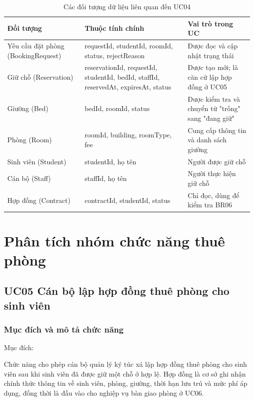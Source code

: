 \begin{table}[H]
\centering
\small
\caption{Các đối tượng dữ liệu liên quan đến UC04}
\label{tab:ch2-8}
\begin{tabularx}{\textwidth}{|>{\raggedright\arraybackslash}p{}|>{\raggedright\arraybackslash}X|>{\raggedright\arraybackslash}p{}|}
\hline
\textbf{Đối tượng} & \textbf{Thuộc tính chính} & \textbf{Vai trò trong UC} \\
\hline
Yêu cầu đặt phòng (BookingRequest) & requestId, studentId, roomId, status, rejectReason & Được đọc và cập nhật trạng thái \\
\hline
Giữ chỗ (Reservation) & reservationId, requestId, studentId, bedId, staffId, reservedAt, expiresAt, status & Được tạo mới; là căn cứ lập hợp đồng ở UC05 \\
\hline
Giường (Bed) & bedId, roomId, status & Được kiểm tra và chuyển từ "trống" sang "đang giữ" \\
\hline
Phòng (Room) & roomId, building, roomType, fee & Cung cấp thông tin và danh sách giường \\
\hline
Sinh viên (Student) & studentId, họ tên & Người được giữ chỗ \\
\hline
Cán bộ (Staff) & staffId, họ tên & Người thực hiện giữ chỗ \\
\hline
Hợp đồng (Contract) & contractId, studentId, status & Chỉ đọc, dùng để kiểm tra BR06 \\
\hline
\end{tabularx}
\end{table}

\section{Phân tích nhóm chức năng thuê phòng}

\subsection{UC05 Cán bộ lập hợp đồng thuê phòng cho sinh viên}

\subsubsection{Mục đích và mô tả chức năng}

Mục đích:

Chức năng cho phép cán bộ quản lý ký túc xá lập hợp đồng thuê phòng cho sinh viên sau khi sinh viên đã được giữ một chỗ ở hợp lệ. Hợp đồng là cơ sở ghi nhận chính thức thông tin về sinh viên, phòng, giường, thời hạn lưu trú và mức phí áp dụng, đồng thời là đầu vào cho nghiệp vụ bàn giao phòng ở UC06.

